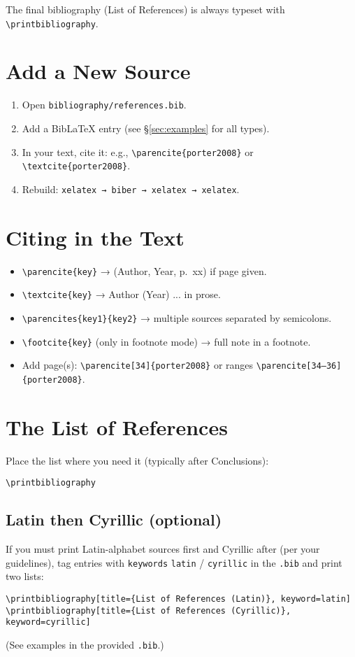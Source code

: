 \noindent The final bibliography (List of References) is always typeset with \verb|\printbibliography|.

\section{Add a New Source}
\begin{enumerate}
  \item Open \texttt{bibliography/references.bib}.
  \item Add a Bib\LaTeX{} entry (see §\ref{sec:examples} for all types).
  \item In your text, cite it: e.g., \verb|\parencite{porter2008}| or \verb|\textcite{porter2008}|.
  \item Rebuild: \texttt{xelatex → biber → xelatex → xelatex}.
\end{enumerate}

\section{Citing in the Text}
\begin{itemize}
  \item \verb|\parencite{key}| → (Author, Year, p.~xx) if page given.
  \item \verb|\textcite{key}| → Author (Year) ... in prose.
  \item \verb|\parencites{key1}{key2}| → multiple sources separated by semicolons.
  \item \verb|\footcite{key}| (only in footnote mode) → full note in a footnote.
  \item Add page(s): \verb|\parencite[34]{porter2008}| or ranges \verb|\parencite[34–36]{porter2008}|.
\end{itemize}

\section{The List of References}
Place the list where you need it (typically after Conclusions):
\begin{verbatim}
\printbibliography
\end{verbatim}

\subsection*{Latin then Cyrillic (optional)}
If you must print Latin-alphabet sources first and Cyrillic after (per your guidelines), tag entries with \texttt{keywords} \texttt{latin} / \texttt{cyrillic} in the \texttt{.bib} and print two lists:
\begin{verbatim}
\printbibliography[title={List of References (Latin)}, keyword=latin]
\printbibliography[title={List of References (Cyrillic)}, keyword=cyrillic]
\end{verbatim}
(See examples in the provided \texttt{.bib}.)

